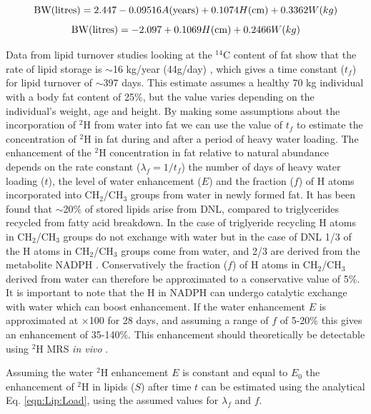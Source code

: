 \begin{equation}
    \textrm{BW(litres)} = 2.447-0.09516A\textrm{(years)}+0.1074H\textrm{(cm)}+0.3362W\textrm({kg})
    \label{eqn:Lip:male}
\end{equation}
\begin{equation}
    \textrm{BW(litres)} = -2.097+0.1069H\textrm{(cm)}+0.2466W\textrm({kg})
    \label{eqn:Lip:female}
\end{equation}

Data from lipid turnover studies looking at the $^{14}$C content of fat show that the rate of lipid storage is $\sim$16 kg/year (44g/day) \cite{Arner2011DynamicsDisease, Spalding2017ImpactTissue}, which gives a time constant ($t_f$) for lipid turnover of $\sim$397 days. This estimate assumes a healthy 70 kg individual with a body fat content of 25\%, but the value varies depending on the individual's weight, age and height. By making some assumptions about the incorporation of $^2$H from water into fat we can use the value of $t_f$ to estimate the concentration of $^2$H in fat during and after a period of heavy water loading. The enhancement of the $^2$H concentration in fat relative to natural abundance depends on the rate constant ($\lambda_f = 1/t_f$) the number of days of heavy water loading ($t$), the level of water enhancement ($E$) and the fraction ($f$) of H atoms incorporated into CH$_2$/CH$_3$ groups from water in newly formed fat. It has been found that $\sim$20\% of stored lipids arise from \ac{DNL}, compared to triglycerides recycled from fatty acid breakdown. In the case of triglyeride recycling H atoms in CH$_2$/CH$_3$ groups do not exchange with water but in the case of \ac{DNL} 1/3 of the H atoms in CH$_2$/CH$_3$ groups come from water, and 2/3 are derived from the metabolite NADPH \cite{Zhang2017ChemicalNADPH}. Conservatively the fraction ($f$) of H atoms in CH$_2$/CH$_3$ derived from water can therefore be approximated to a conservative value of 5\%. It is important to note that the H in NADPH can undergo catalytic exchange with water which can boost enhancement. If the water enhancement $E$ is approximated at $\times$100 for 28 days, and assuming a range of $f$ of 5-20\% this gives an enhancement of 35-140\%. This enhancement should theoretically be detectable using $^2$H MRS \textit{in vivo} \cite{Brereton1986PreliminarySpectroscopy}. 

Assuming the water $^2$H enhancement $E$ is constant and equal to $E_0$ the enhancement of $^2$H in lipids ($S$) after time $t$ can be estimated using the analytical Eq. \ref{eqn:Lip:Load}, using the assumed values for $\lambda_f$ and $f$. 

